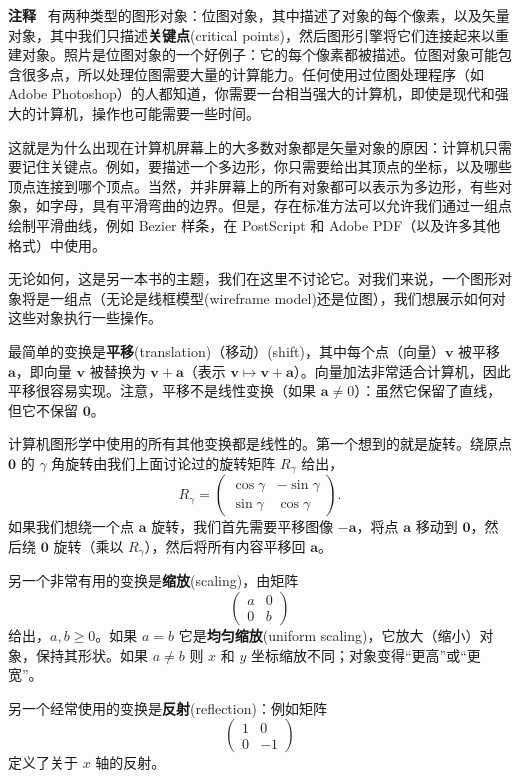 \textbf{注释}~ 有两种类型的图形对象：位图对象，其中描述了对象的每个像素，以及矢量对象，其中我们只描述\textbf{关键点}(critical points)，然后图形引擎将它们连接起来以重建对象。照片是位图对象的一个好例子：它的每个像素都被描述。位图对象可能包含很多点，所以处理位图需要大量的计算能力。任何使用过位图处理程序（如 Adobe Photoshop）的人都知道，你需要一台相当强大的计算机，即使是现代和强大的计算机，操作也可能需要一些时间。

这就是为什么出现在计算机屏幕上的大多数对象都是矢量对象的原因：计算机只需要记住关键点。例如，要描述一个多边形，你只需要给出其顶点的坐标，以及哪些顶点连接到哪个顶点。当然，并非屏幕上的所有对象都可以表示为多边形，有些对象，如字母，具有平滑弯曲的边界。但是，存在标准方法可以允许我们通过一组点绘制平滑曲线，例如 Bezier 样条，在 PostScript 和 Adobe PDF（以及许多其他格式）中使用。

无论如何，这是另一本书的主题，我们在这里不讨论它。对我们来说，一个图形对象将是一组点（无论是线框模型(wireframe model)还是位图），我们想展示如何对这些对象执行一些操作。

最简单的变换是\textbf{平移}(translation)（移动）(shift)，其中每个点（向量）$\mathbf{v}$ 被平移 $\mathbf{a}$，即向量 $\mathbf{v}$ 被替换为 $\mathbf{v} + \mathbf{a}$（表示 $ \mathbf{v} \mapsto \mathbf{v} + \mathbf{a} $）。向量加法非常适合计算机，因此平移很容易实现。注意，平移不是线性变换（如果 $\mathbf{a} \neq 0$）：虽然它保留了直线，但它不保留 $\mathbf{0}$。

计算机图形学中使用的所有其他变换都是线性的。第一个想到的就是旋转。绕原点 $\mathbf{0}$ 的 $\gamma$ 角旋转由我们上面讨论过的旋转矩阵 $R_\gamma$ 给出， $$R_\gamma = \begin{pmatrix} \cos \gamma & -\sin \gamma \\ \sin \gamma & \cos \gamma \end{pmatrix}.$$
如果我们想绕一个点 $\mathbf{a}$ 旋转，我们首先需要平移图像 $-\mathbf{a}$，将点 $\mathbf{a}$ 移动到 $\mathbf{0}$，然后绕 $\mathbf{0}$ 旋转（乘以 $R_\gamma$），然后将所有内容平移回 $\mathbf{a}$。

另一个非常有用的变换是\textbf{缩放}(scaling)，由矩阵 
$$\begin{pmatrix} a & 0 \\ 0 & b \end{pmatrix}$$
给出，$a, b \ge 0$。如果 $a=b$ 它是\textbf{均匀缩放}(uniform scaling)，它放大（缩小）对象，保持其形状。如果 $a \neq b$ 则 $x$ 和 $y$ 坐标缩放不同；对象变得“更高”或“更宽”。

另一个经常使用的变换是\textbf{反射}(reflection)：例如矩阵 
$$\begin{pmatrix} 1 & 0 \\ 0 & -1 \end{pmatrix}$$
定义了关于 $x$ 轴的反射。


